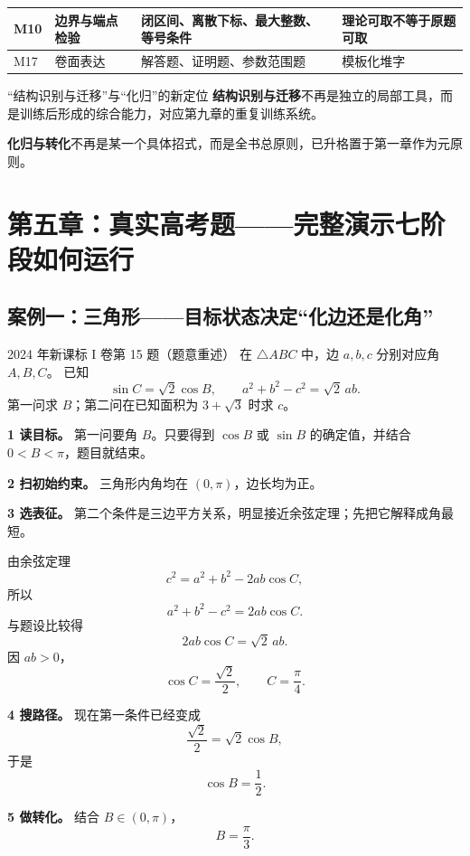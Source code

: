 \documentclass[11pt,a4paper]{ctexart}
\begin{document}
\begin{longtable}{p{2cm}p{3.3cm}p{5.3cm}p{4.8cm}}
\toprule
M10 & 边界与端点检验 & 闭区间、离散下标、最大整数、等号条件 & 理论可取不等于原题可取\\ \hline
M17 & 卷面表达 & 解答题、证明题、参数范围题 & 模板化堆字\\
\bottomrule
\end{longtable}

\begin{resultbox}{“结构识别与迁移”与“化归”的新定位}
\textbf{结构识别与迁移}不再是独立的局部工具，而是训练后形成的综合能力，对应第九章的重复训练系统。

\textbf{化归与转化}不再是某一个具体招式，而是全书总原则，已升格置于第一章作为元原则。
\end{resultbox}

\section{第五章：真实高考题——完整演示七阶段如何运行}

\subsection{案例一：三角形——目标状态决定“化边还是化角”}

\begin{examplebox}{2024 年新课标 I 卷第 15 题（题意重述）}
在 $\triangle ABC$ 中，边 $a,b,c$ 分别对应角 $A,B,C$。
已知
\[
\sin C=\sqrt2\cos B,\qquad
a^2+b^2-c^2=\sqrt2\,ab.
\]
第一问求 $B$；第二问在已知面积为 $3+\sqrt3$ 时求 $c$。
\end{examplebox}

\textbf{1 读目标。}
第一问要角 $B$。只要得到 $\cos B$ 或 $\sin B$ 的确定值，并结合 $0<B<\pi$，题目就结束。

\textbf{2 扫初始约束。}
三角形内角均在 $(0,\pi)$，边长均为正。

\textbf{3 选表征。}
第二个条件是三边平方关系，明显接近余弦定理；先把它解释成角最短。

由余弦定理
\[
c^2=a^2+b^2-2ab\cos C,
\]
所以
\[
a^2+b^2-c^2=2ab\cos C.
\]
与题设比较得
\[
2ab\cos C=\sqrt2\,ab.
\]
因 $ab>0$，
\[
\cos C=\frac{\sqrt2}{2},
\qquad C=\frac{\pi}{4}.
\]

\textbf{4 搜路径。}
现在第一条件已经变成
\[
\frac{\sqrt2}{2}=\sqrt2\cos B,
\]
于是
\[
\cos B=\frac12.
\]

\textbf{5 做转化。}
结合 $B\in(0,\pi)$，
\[
\boxed{B=\frac{\pi}{3}}.
\]
\end{document}
